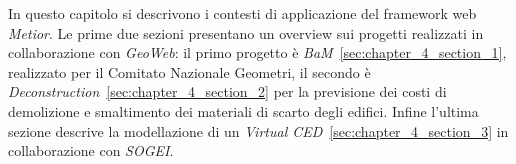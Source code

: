 In questo capitolo si descrivono i contesti di applicazione del framework web \emph{Metior}.
Le prime due sezioni presentano un overview sui progetti realizzati in collaborazione con \emph{GeoWeb}:
il primo progetto è \emph{BaM}~\ref{sec:chapter_4_section_1}, realizzato per il Comitato Nazionale Geometri,
il secondo è \emph{Deconstruction}~\ref{sec:chapter_4_section_2} per la previsione dei
costi di demolizione e smaltimento dei materiali di scarto degli edifici.
Infine l'ultima sezione descrive la modellazione di un \emph{Virtual CED}~\ref{sec:chapter_4_section_3}
in collaborazione con \emph{SOGEI}.
